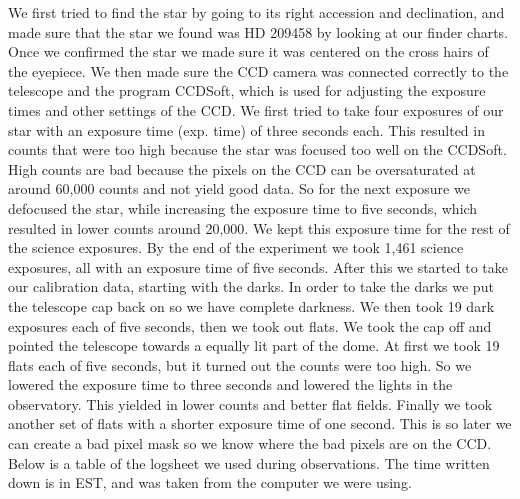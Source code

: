 \documentclass{aastex61}
\begin{document}
We first tried to find the star by going to its right accession and declination, and made sure that the star we found was HD 209458 by looking at our finder charts. Once we confirmed the star we made sure it was centered on the cross hairs of the eyepiece. We then made sure the CCD camera was connected correctly to the telescope and the program CCDSoft, which is used for adjusting the exposure times and other settings of the CCD. We first tried to take four exposures of our star with an exposure time (exp. time) of three seconds each. This resulted in counts that were too high because the star was focused too well on the CCDSoft. High counts are bad because the pixels on the CCD can be oversaturated at around 60,000 counts and not yield good data. So for the next exposure we defocused the star, while increasing the exposure time to five seconds, which resulted in lower counts around 20,000. We kept this exposure time for the rest of the science exposures. By the end of the experiment we took 1,461 science exposures, all with an exposure time of five seconds. After this we started to take our calibration data, starting with the darks. In order to take the darks we put the telescope cap back on so we have complete darkness. We then took 19 dark exposures each of five seconds, then we took out flats. We took the cap off and pointed the telescope towards a equally lit part of the dome. At first we took 19 flats each of five seconds, but it turned out the counts were too high. So we lowered the exposure time to three seconds and lowered the lights in the observatory. This yielded in lower counts and better flat fields. Finally we took another set of flats with a shorter exposure time of one second. This is so later we can create a bad pixel mask so we know where the bad pixels are on the CCD. Below is a table of the logsheet we used during observations. The time written down is in EST, and was taken from the computer we were using. 
\end{document}

